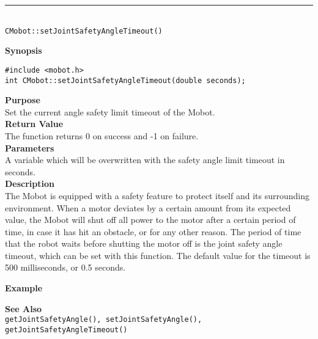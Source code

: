 \noindent
\vspace{5pt}
\rule{4.5in}{0.015in}\\
\noindent
{\LARGE \texttt{CMobot::setJointSafetyAngleTimeout()}}\\
{}

\noindent
{\bf Synopsis}
\vspace{-8pt}
\begin{verbatim}
#include <mobot.h>
int CMobot::setJointSafetyAngleTimeout(double seconds);
\end{verbatim}

\noindent
{\bf Purpose}\\
Set the current angle safety limit timeout of the Mobot.\\

\noindent
{\bf Return Value}\\
The function returns 0 on success and -1 on failure.\\

\noindent
{\bf Parameters}\\
A variable which will be overwritten with the safety angle limit timeout in seconds.\\

\noindent
{\bf Description}\\
The Mobot is equipped with a safety feature to protect itself and its surrounding
environment. When a motor deviates by a certain amount from its expected value, 
the Mobot will shut off all power to the motor after a certain period of time,
in case it has hit an obstacle, or for any other reason. The period of time that the
robot waits before shutting the motor off is the joint safety angle timeout, which
can be set with this function. The default value for the timeout is 500 milliseconds,
or 0.5 seconds.
 
\noindent
{\bf Example}\\
\noindent

\noindent
{\bf See Also}\\
\texttt{getJointSafetyAngle(), setJointSafetyAngle(), getJointSafetyAngleTimeout()}\\



